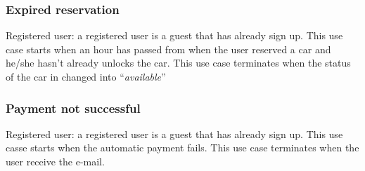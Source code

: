 \subsubsection{Expired reservation}
\begin{UseCase}
	{Registered user: a registered user is a guest that has already sign up.}
	{This use case starts when an hour has passed from when the user reserved a car and he/she hasn't already unlocks the car.}
	{
	}
	{This use case terminates when the status of the car in changed into ``\textit{available}''}{}
\end{UseCase}

\subsubsection{Payment not successful}
\begin{UseCase}
	{Registered user: a registered user is a guest that has already sign up.}
	{This use casse starts when the automatic payment fails.}
	{
	}
	{This use case terminates when the user receive the e-mail.}{}
\end{UseCase}

